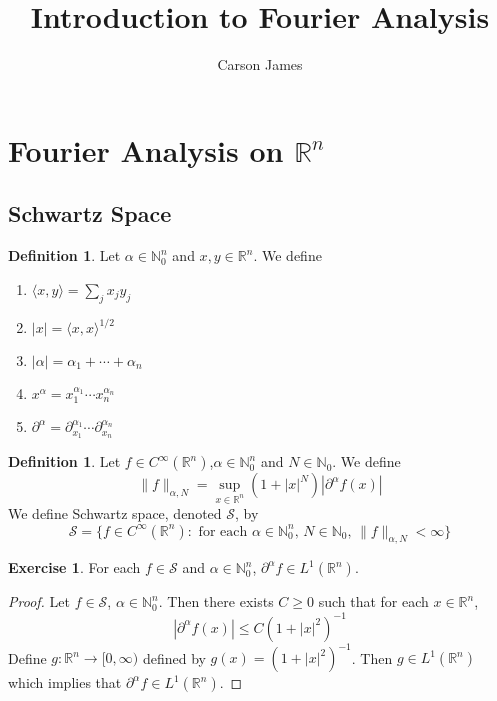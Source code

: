 \documentclass[12pt]{amsart}
\theoremstyle{definition}
\newtheorem{defn}[definition]{Definition}
\newtheorem{ex}[definition]{Exercise}
\newcommand{\p}{\partial}
\newcommand{\al}{\alpha}
\newcommand{\N}{\mathbb{N}}
\newcommand{\R}{\mathbb{R}}
\newcommand{\MS}{\mathcal{S}}
\renewcommand{\r}{\rangle}
\renewcommand{\l}{\langle}
\newcommand{\Rg}{[0,\infty)}
\newcommand{\lex}[1]{\label{ex:#1}}
\newcommand{\ld}[1]{\label{defn:#1}}
\begin{document}
	
	\title{Introduction to Fourier Analysis}
	\author{Carson James}
	\maketitle
	
	\tableofcontents
	
	\newpage
	
	
	\section{Fourier Analysis on $\R^n$}	

	\subsection{Schwartz Space}
	\begin{defn}
	\ld{100} Let $\al \in \N_0^n$ and $x, y \in \R^n$. We define 
	\begin{enumerate}
	\item $\l x , y\r  = \sum_{j}x_jy_j$
	\item $|x| = \l x, x\r^{1/2}$
	\item $|\al| = \al_1 + \cdots + \al_n$
	\item $x^\al = x_1^{\al_1}\cdots x_n^{\al_n}$
	\item $\p^{\al} = \p_{x_1}^{\al_1} \cdots \p_{x_n}^{\al_n}$
	\end{enumerate}
	\end{defn}	
	
	\begin{defn}
	\ld{101} Let $f \in C^{\infty}(\R^n)$,$\al \in \N_0^n$ and $N \in \N_0$. We define $$\|f\|_{\al, N} = \sup_{x \in \R^n} (1+|x|^N) |\p^{\al}f (x) |$$
	We define Schwartz space, denoted $\MS$, by $$\MS = \{f \in C^{\infty}(\R^n): \text{ for each $\al \in \N_0^n$, $N \in \N_0$, } \|f\|_{\al, N} < \infty\}$$
	\end{defn}
	
	\begin{ex}
	\lex{102} For each $f \in \MS$ and $\al \in \N_0^n$, $\p^\al f \in L^1(\R^n)$.
	\end{ex}
	
	\begin{proof}
	Let $f \in \MS$, $\al \in \N_0^n$. Then there exists $C \geq 0$ such that for each $x \in \R^n$, $$| \p^{\al} f(x)| \leq C(1+|x|^{2})^{-1}$$
	Define $g:\R^n \rightarrow \Rg$ defined by $g(x) = (1+|x|^{2})^{-1}$. Then $g \in L^1(\R^n)$ which implies that $\p^{\al} f \in L^1(\R^n)$.
	\end{proof}
	
\end{document}
